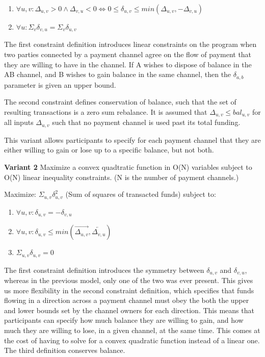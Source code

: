 \documentclass[12pt]{article}
\begin{document}
\begin{enumerate}
	\item $\forall u, v: \Delta_{u,v} > 0 \wedge \Delta_{v,u} < 0 \Leftrightarrow 0 \leq \delta_{u,v} \leq min(\Delta_{u,v}, -\Delta_{v,u}) $

	\item $\forall u: \Sigma_{v} \delta_{v,u} = \Sigma_{v} \delta_{u,v} $
	
\end{enumerate}

The first constraint definition introduces linear constraints on the program when two parties connected by a payment channel agree on the flow of payment that they are willing to have in the channel. If A wishes to dispose of balance in the AB channel, and B wishes to gain balance in the same channel, then the $\delta_{a,b}$ parameter is given an upper bound.

The second constraint defines conservation of balance, such that the set of resulting transactions is a zero sum rebalance. It is assumed that $\Delta_{u,v} \leq bal_{u,v}$ for all inputs $\Delta_{u,v}$ such that no payment channel is used past its total funding.


This variant allows participants to specify for each payment channel that they are either willing to gain or lose up to a specific balance, but not both.


\textbf{Variant 2} Maximize a convex quadtratic function in O(N) variables subject to O(N) linear inequality constraints. (N is the number of payment channels.)

Maximize: $\Sigma_{u,v} \delta_{u,v}^2$ (Sum of squares of transacted funds) subject to:

\begin{enumerate}
	\item $\forall u, v: \delta_{u,v} = -\delta_{v,u}$

	\item $\forall u, v: \delta_{u,v} \leq min(\overrightarrow{\Delta_{u,v}},\overleftarrow{\Delta_{v,u}})$ 

	\item $\Sigma_{u,v} \delta_{u,v} = 0$
\end{enumerate}

The first constraint definition introduces the symmetry between $\delta_{u,v}$ and $\delta_{v,u}$, whereas in the previous model, only one of the two was ever present. This gives us more flexibility in the second constraint definition, which specifies that funds flowing in a direction across a payment channel must obey the both the upper and lower bounds set by the channel owners for each direction. This means that participants can specify how much balance they are willing to gain, and how much they are willing to lose, in a given channel, at the same time. This comes at the cost of having to solve for a convex quadratic function instead of a linear one. The third definition conserves balance.
\end{document}
